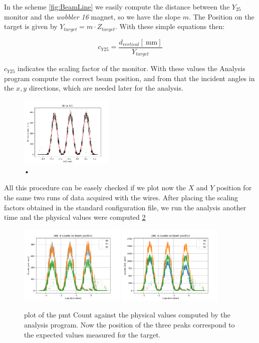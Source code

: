 In the scheme \ref{fig:BeamLine} we easily compute the distance between the $Y_{25}$ monitor and the \textit{wobbler 16} magnet, so we have the slope $m$. The Position on the target is given by $Y_{target} = m \cdot Z_{target}$. With these simple equations then:

\begin{equation}
c_{Y25} = \dfrac{d_{vertical} [\SI{}{\milli \meter}]}{ Y_{target}} 
\end{equation}

$c_{Y25}$ indicates the scaling factor of the monitor. With these values the Analysis program compute the correct beam position, and from that the incident angles in the $x,y$ directions, which are needed later for the analysis.

\begin{figure}[hbtp]
\centering
\includegraphics[width=0.4\textwidth]{Analysis/HorizontalCalibration.png}
\caption{•}
\label{fig:HorizontalCalibration}
\end{figure}

All this procedure can be easely checked if we plot now the $X$ and $Y$ position for the same two runs of data acquired with the wires. After placing the scaling factors obtained in the standard configuration file, we run the analysis another time and the physical values were computed \ref{fig:CheckHori}

\begin{figure}[hbtp]
\centering
\includegraphics[width=0.45\textwidth]{Analysis/XcheckB.png} 
\includegraphics[width=0.45\textwidth]{Analysis/XcheckA.png}
\caption{plot of the pmt Count against the physical values computed by the analysis program. Now the position of the three peaks correspond to the expected values measured for the target.}
\label{fig:CheckHori}
\end{figure}


